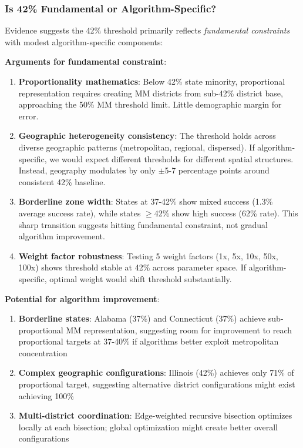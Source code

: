 \subsubsection{Is 42\% Fundamental or Algorithm-Specific?}

Evidence suggests the 42\% threshold primarily reflects \textit{fundamental constraints} with modest algorithm-specific components:

\textbf{Arguments for fundamental constraint}:
\begin{enumerate}
    \item \textbf{Proportionality mathematics}: Below 42\% state minority, proportional representation requires creating MM districts from sub-42\% district base, approaching the 50\% MM threshold limit. Little demographic margin for error.

    \item \textbf{Geographic heterogeneity consistency}: The threshold holds across diverse geographic patterns (metropolitan, regional, dispersed). If algorithm-specific, we would expect different thresholds for different spatial structures. Instead, geography modulates by only $\pm$5-7 percentage points around consistent 42\% baseline.

    \item \textbf{Borderline zone width}: States at 37-42\% show mixed success (1.3\% average success rate), while states $\geq$42\% show high success (62\% rate). This sharp transition suggests hitting fundamental constraint, not gradual algorithm improvement.

    \item \textbf{Weight factor robustness}: Testing 5 weight factors (1x, 5x, 10x, 50x, 100x) shows threshold stable at 42\% across parameter space. If algorithm-specific, optimal weight would shift threshold substantially.
\end{enumerate}

\textbf{Potential for algorithm improvement}:
\begin{enumerate}
    \item \textbf{Borderline states}: Alabama (37\%) and Connecticut (37\%) achieve sub-proportional MM representation, suggesting room for improvement to reach proportional targets at 37-40\% if algorithms better exploit metropolitan concentration

    \item \textbf{Complex geographic configurations}: Illinois (42\%) achieves only 71\% of proportional target, suggesting alternative district configurations might exist achieving 100\%

    \item \textbf{Multi-district coordination}: Edge-weighted recursive bisection optimizes locally at each bisection; global optimization might create better overall configurations
\end{enumerate}

